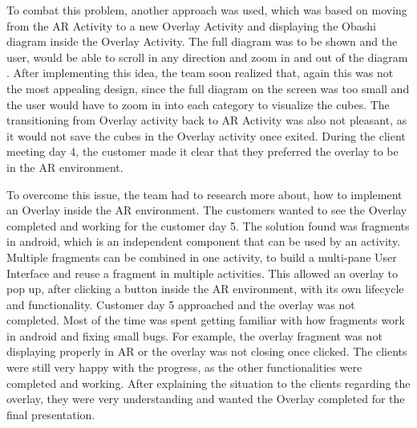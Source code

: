 \documentclass{l3proj}
\begin{document}
To combat this problem, another approach was used, which was based on moving from the
AR Activity to a new Overlay Activity\cite{MovingActivities} and displaying the Obashi 
diagram inside the Overlay Activity. The full diagram was to be shown and the user, would 
be able to scroll in any direction and zoom in and out of the diagram \cite{Zooming}. After 
implementing this idea, the team soon realized that, again this was not the most appealing 
design, since the full diagram on the screen was too small and the user would have to zoom 
in into each category to visualize the cubes. The transitioning from Overlay activity back to 
AR Activity was also not pleasant, as it would not save the cubes in the Overlay activity once 
exited. During the client meeting day 4, the customer made it clear that they preferred the 
overlay to be in the AR environment.

To overcome this issue, the team had to research more about, how to implement an Overlay
inside the AR environment. The customers wanted to see the Overlay completed and working for 
the customer day 5. The solution found was fragments in android, which is an independent 
component that can be used by an activity. Multiple fragments can be combined in one activity, 
to build a multi-pane User Interface and reuse a fragment in multiple activities\cite{Fragments}. 
This allowed an overlay to pop up, after clicking a button inside the AR environment, with its 
own lifecycle and functionality. Customer day 5 approached and the overlay was not completed. 
Most of the time was spent getting familiar with how fragments work in android and fixing small 
bugs. For example, the overlay fragment was not displaying properly in AR or the overlay was 
not closing once clicked. The clients were still very happy with the progress, as the other 
functionalities were completed and working. After explaining the situation to the clients 
regarding the overlay, they were very understanding and wanted the Overlay completed for the 
final presentation. 
\end{document}

